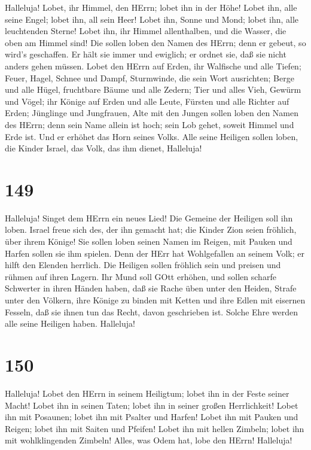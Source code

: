  Halleluja! Lobet, ihr Himmel, den HErrn; lobet ihn in der
Höhe!  Lobet ihn, alle seine Engel; lobet ihn, all sein
Heer!  Lobet ihn, Sonne und Mond; lobet ihn, alle
leuchtenden Sterne!  Lobet ihn, ihr Himmel allenthalben, und
die Wasser, die oben am Himmel sind!  Die sollen loben den
Namen des HErrn; denn er gebeut, so wird's geschaffen.  Er
hält sie immer und ewiglich; er ordnet sie, daß sie nicht anders gehen
müssen.  Lobet den HErrn auf Erden, ihr Walfische und alle
Tiefen;  Feuer, Hagel, Schnee und Dampf, Sturmwinde, die
sein Wort ausrichten;  Berge und alle Hügel, fruchtbare
Bäume und alle Zedern;  Tier und alles Vieh, Gewürm und
Vögel;  ihr Könige auf Erden und alle Leute, Fürsten und
alle Richter auf Erden;  Jünglinge und Jungfrauen, Alte mit
den Jungen  sollen loben den Namen des HErrn; denn sein
Name allein ist hoch; sein Lob gehet, soweit Himmel und Erde ist.
 Und er erhöhet das Horn seines Volks. Alle seine Heiligen
sollen loben, die Kinder Israel, das Volk, das ihm dienet, Halleluja!

\hypertarget{section-148}{%
\section{149}\label{section-148}}

 Halleluja! Singet dem HErrn ein neues Lied! Die Gemeine der
Heiligen soll ihn loben.  Israel freue sich des, der ihn
gemacht hat; die Kinder Zion seien fröhlich, über ihrem Könige!
 Sie sollen loben seinen Namen im Reigen, mit Pauken und
Harfen sollen sie ihm spielen.  Denn der HErr hat
Wohlgefallen an seinem Volk; er hilft den Elenden herrlich. 
Die Heiligen sollen fröhlich sein und preisen und rühmen auf ihren
Lagern.  Ihr Mund soll GOtt erhöhen, und sollen scharfe
Schwerter in ihren Händen haben,  daß sie Rache üben unter
den Heiden, Strafe unter den Völkern,  ihre Könige zu binden
mit Ketten und ihre Edlen mit eisernen Fesseln,  daß sie
ihnen tun das Recht, davon geschrieben ist. Solche Ehre werden alle
seine Heiligen haben. Halleluja!

\hypertarget{section-149}{%
\section{150}\label{section-149}}

 Halleluja! Lobet den HErrn in seinem Heiligtum; lobet ihn
in der Feste seiner Macht!  Lobet ihn in seinen Taten; lobet
ihn in seiner großen Herrlichkeit!  Lobet ihn mit Posaunen;
lobet ihn mit Psalter und Harfen!  Lobet ihn mit Pauken und
Reigen; lobet ihn mit Saiten und Pfeifen!  Lobet ihn mit
hellen Zimbeln; lobet ihn mit wohlklingenden Zimbeln! 
Alles, was Odem hat, lobe den HErrn! Halleluja!
